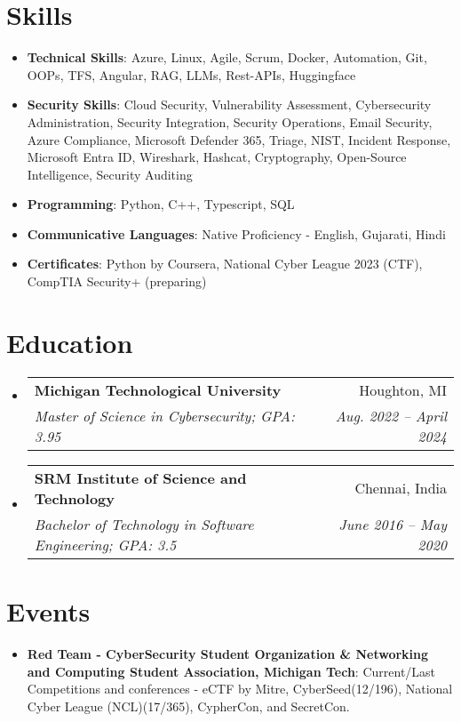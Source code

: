 \documentclass[a4paper,10pt]{article}
\makeatletter
\newcommand{\resumeItem}[2]{
  \item\small{
    \textbf{#1}{: #2 \vspace{-2pt}}
  }
}
\newcommand{\resumeSubheading}[4]{
  \vspace{-1pt}\item
    \begin{tabular*}{0.97\textwidth}[t]{l@{\extracolsep{\fill}}r}
      \textbf{#1} & #2 \\
      \textit{\small#3} & \textit{\small #4} \\
    \end{tabular*}\vspace{-5pt}
}
\newcommand{\resumeSubItem}[2]{\resumeItem{#1}{#2}\vspace{-4pt}}
\newcommand{\resumeSubHeadingListStart}{\begin{itemize}[leftmargin=*]}
\newcommand{\resumeSubHeadingListEnd}{\end{itemize}}
\makeatother
\begin{document}
\section{Skills}
  \resumeSubHeadingListStart
    \resumeSubItem{Technical Skills}
      {Azure, Linux, Agile, Scrum, Docker, Automation, Git, OOPs, TFS, Angular, RAG, LLMs, Rest-APIs, Huggingface}
    \resumeSubItem{Security Skills}
      {Cloud Security, Vulnerability Assessment, Cybersecurity Administration, Security Integration, Security Operations, Email Security, Azure Compliance, Microsoft Defender 365, Triage, NIST, Incident Response, Microsoft Entra ID, Wireshark, Hashcat, Cryptography, Open-Source Intelligence, Security Auditing}
    \resumeSubItem{Programming}
      {Python, C++, Typescript, SQL}
    \resumeSubItem{Communicative Languages}
      {Native Proficiency - English, Gujarati, Hindi}
    \resumeSubItem{Certificates}
      {Python by Coursera, National Cyber League 2023 (CTF), CompTIA Security+ (preparing)}
  \resumeSubHeadingListEnd

\section{Education}
  \resumeSubHeadingListStart
    \resumeSubheading
      {Michigan Technological University}{Houghton, MI}
      {Master of Science in Cybersecurity; GPA: 3.95}{Aug. 2022 -- April 2024}
    \resumeSubheading
      {SRM Institute of Science and Technology}{Chennai, India}
      {Bachelor of Technology in Software Engineering; GPA: 3.5}{June 2016 -- May 2020}
  \resumeSubHeadingListEnd
  
\section{Events}
  \resumeSubHeadingListStart
  \resumeSubItem{Red Team - CyberSecurity Student Organization \& Networking and Computing Student Association, Michigan Tech}
      {Current/Last Competitions and conferences - eCTF by Mitre, CyberSeed(12/196), National Cyber League (NCL)(17/365), CypherCon, and SecretCon.}
  \resumeSubHeadingListEnd

\end{document}
